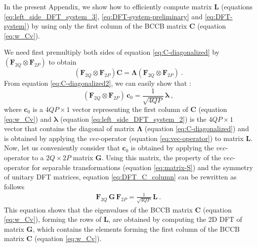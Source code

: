 

In the present Appendix, we show how to efficiently compute matrix $\mathbf{L}$
(equations \ref{eq:left_side_DFT_system_3}, \ref{eq:DFT-system-preliminary} 
and \ref{eq:DFT-system}) by using only the first column of the BCCB matrix
$\mathbf{C}$ (equation \ref{eq:w_Cv}).

We need first premultiply both sides of equation \ref{eq:C-diagonalized}
by $\left(\mathbf{F}_{2Q} \otimes \mathbf{F}_{2P} \right)$ to obtain
\begin{equation}
\left(\mathbf{F}_{2Q} \otimes \mathbf{F}_{2P} \right) \mathbf{C} = 
\boldsymbol{\Lambda}
\left(\mathbf{F}_{2Q} \otimes \mathbf{F}_{2P} \right) \: .
\label{eq:C-diagonalized2}
\end{equation}
From equation \ref{eq:C-diagonalized2}, we can easily show that 
\citep[][ p. 77]{chan-jin2007}:
\begin{equation}
	\left(\mathbf{F}_{2Q} \otimes \mathbf{F}_{2P} \right) \, 
	\mathbf{c}_{0} = \frac{1}{\sqrt{4QP}} \, \boldsymbol{\lambda} \: ,
	\label{eq:DFT_C_column}
\end{equation}
where $\mathbf{c}_{0}$ is a $4QP \times 1$ vector representing the first column of 
$\mathbf{C}$ (equation \ref{eq:w_Cv}) and 
$\boldsymbol{\lambda}$ (equation \ref{eq:left_side_DFT_system_2}) is the $4QP \times 1$ 
vector that contains the diagonal of matrix $\boldsymbol{\Lambda}$ (equation \ref{eq:C-diagonalized}) 
and is obtained by applying the $vec$-operator (equation \ref{eq:vec-operator}) to matrix $\mathbf{L}$.
Now, let us conveniently consider that $\mathbf{c}_{0}$ is obtained by applying the $vec$-operator 
to a $2Q \times 2P$ matrix $\mathbf{G}$.
Using this matrix, the property of the $vec$-operator for separable transformations 
(equation \ref{eq:matrix-S}) and the symmetry of unitary DFT matrices, equation \ref{eq:DFT_C_column} 
can be rewritten as follows
\begin{eqnarray}
	\mathbf{F}_{2Q} \, \mathbf{G} \, \mathbf{F}_{2P} = 
	\frac{1}{\sqrt{4QP}} \, \mathbf{L} \: .
	\label{eq:DTF_G}
\end{eqnarray}
This equation shows that the eigenvalues of the BCCB matrix $\mathbf{C}$ 
(equation \ref{eq:w_Cv}), forming the rows of $\mathbf{L}$,
are obtained by computing the 2D DFT of matrix $\mathbf{G}$,
which contains the elements forming the first column of the BCCB matrix 
$\mathbf{C}$ (equation \ref{eq:w_Cv}).